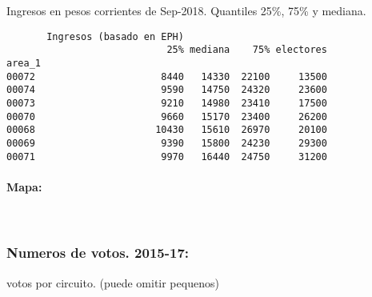 \documentclass[11pt]{article}
\begin{document}
    
    Ingresos en pesos corrientes de Sep-2018. Quantiles 25\%, 75\% y
mediana.

    
    
    \begin{verbatim}
       Ingresos (basado en EPH)                         
                            25% mediana    75% electores
area_1                                                  
00072                      8440   14330  22100     13500
00074                      9590   14750  24320     23600
00073                      9210   14980  23410     17500
00070                      9660   15170  23400     26200
00068                     10430   15610  26970     20100
00069                      9390   15800  24230     29300
00071                      9970   16440  24750     31200
    \end{verbatim}

    
    \hypertarget{mapa}{%
\paragraph{Mapa:}\label{mapa}}

    
    \begin{center}
    \end{center}
    { \hspace*{\fill} \\}
    
    \hypertarget{numeros-de-votos.-2015-17}{%
\subsubsection{Numeros de votos.
2015-17:}\label{numeros-de-votos.-2015-17}}

    
    votos por circuito. (puede omitir pequenos)

    
    
\end{document}
